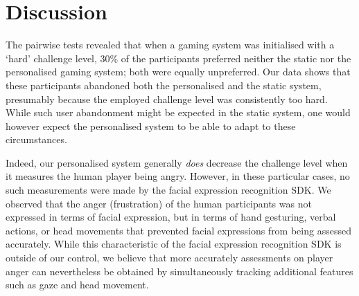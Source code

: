 \documentclass[letterpaper]{article}
\begin{document}
\section{Discussion}\label{sec:discussion}

The pairwise tests revealed that when a gaming system was initialised with a `hard' challenge level, 30\% of the participants preferred neither the static nor the personalised gaming system; both were equally unpreferred. Our data shows that these participants abandoned both the personalised and the static system, presumably because the employed challenge level was consistently too hard. While such user abandonment might be expected in the static system, one would however expect the personalised system to be able to adapt to these circumstances.

Indeed, our personalised system generally \emph{does} decrease the challenge level when it measures the human player being angry. However, in these particular cases, no such measurements were made by the facial expression recognition SDK. We observed that the anger (frustration) of the human participants was not expressed in terms of facial expression, but in terms of hand gesturing, verbal actions, or head movements that prevented facial expressions from being assessed accurately. While this characteristic of the facial expression recognition SDK is outside of our control, we believe that more accurately assessments on player anger can nevertheless be obtained by simultaneously tracking additional features such as gaze and head movement.
\end{document}
